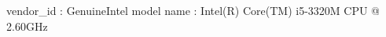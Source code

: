 \documentclass{article}
\begin{document}
vendor_id       : GenuineIntel
model name      : Intel(R) Core(TM) i5-3320M CPU @ 2.60GHz
\end{document}
